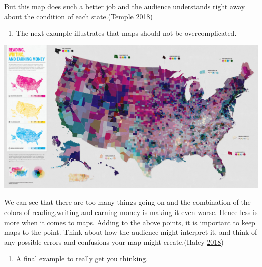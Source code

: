 \documentclass[]{book}
\providecommand{\tightlist}{%
  \setlength{\itemsep}{0pt}\setlength{\parskip}{0pt}}
\begin{document}
But this map does such a better job and the audience understands right away about the condition of each state.(Temple \protect\hyperlink{ref-profit_ratio}{2018})

\begin{enumerate}
\def\labelenumi{\arabic{enumi}.}
\setcounter{enumi}{1}
\tightlist
\item
  The next example illustrates that maps should not be overcomplicated.
\end{enumerate}

\includegraphics{images/map_colors.png}

We can see that there are too many things going on and the combination of the colors of reading,writing and earning money is making it even worse. Hence less is more when it comes to maps.
Adding to the above points, it is important to keep maps to the point. Think about how the audience might interpret it, and think of any possible errors and confusions your map might create.(Haley \protect\hyperlink{ref-good_bad_maps_tips}{2018})

\begin{enumerate}
\def\labelenumi{\arabic{enumi}.}
\setcounter{enumi}{2}
\tightlist
\item
  A final example to really get you thinking.
\end{enumerate}
\end{document}
